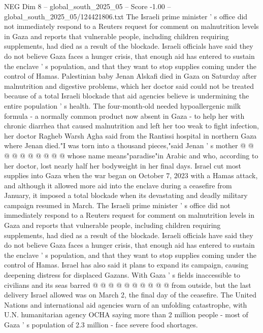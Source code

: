 \begin{textsample}{NEG Dim 8 – global\_south\_2025\_05 – Score -1.00 – global\_south\_2025\_05/124421806.txt}  \label{ex:f8_neg_313}
The Israeli prime minister ' s office did not immediately respond to a Reuters request for comment on malnutrition levels in Gaza and reports that vulnerable people, including children requiring supplements, had died as a result of the blockade.
Israeli officials have said they do not believe Gaza faces a hunger crisis, that enough aid has entered to sustain the enclave ' s population, and that they want to stop supplies coming under the control of Hamas.
Palestinian baby Jenan Alskafi died in Gaza on Saturday after malnutrition and digestive problems, which her doctor said could not be treated because of a total Israeli blockade that aid agencies believe is undermining the entire population ' s health.
The four-month-old needed hypoallergenic milk formula - a normally common product now absent in Gaza - to help her with chronic diarrhea that caused malnutrition and left her too weak to fight infection, her doctor Ragheb Warsh Agha said from the Rantissi hospital in northern Gaza where Jenan died."I was torn into a thousand pieces,"said Jenan ' s mother @ @ @ @ @ @ @ @ @ @ whose name means"paradise"in Arabic and who, according to her doctor, lost nearly half her bodyweight in her final days.
Israel cut most supplies into Gaza when the war began on October 7, 2023 with a Hamas attack, and although it allowed more aid into the enclave during a ceasefire from January, it imposed a total blockade when its devastating and deadly military campaign resumed in March.
The Israeli prime minister ' s office did not immediately respond to a Reuters request for comment on malnutrition levels in Gaza and reports that vulnerable people, including children requiring supplements, had died as a result of the blockade.
Israeli officials have said they do not believe Gaza faces a hunger crisis, that enough aid has entered to sustain the enclave ' s population, and that they want to stop supplies coming under the control of Hamas.
Israel has also said it plans to expand its campaign, causing deepening distress for displaced Gazans.
With Gaza ' s fields inaccessible to civilians and its seas barred @ @ @ @ @ @ @ @ @ @ from outside, but the last delivery Israel allowed was on March 2, the final day of the ceasefire.
The United Nations and international aid agencies warn of an unfolding catastrophe, with U.N. humanitarian agency OCHA saying more than 2 million people - most of Gaza ' s population of 2.3 million - face severe food shortages.

\end{textsample}
